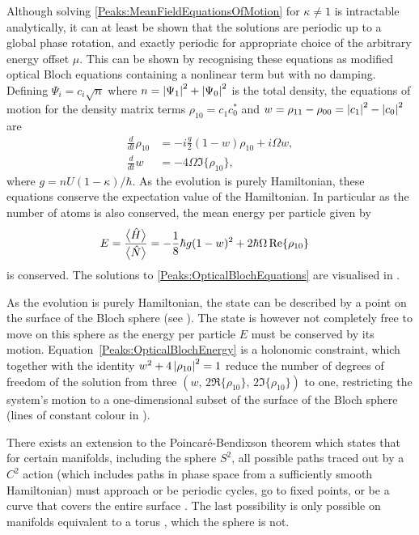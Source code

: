 Although solving \eqref{Peaks:MeanFieldEquationsOfMotion} for $\kappa \neq 1$ is intractable analytically, it can at least be shown that the solutions are periodic up to a global phase rotation, and exactly periodic for appropriate choice of the arbitrary energy offset $\mu$. This can be shown by recognising these equations as modified optical Bloch equations containing a nonlinear term but with no damping. Defining $\Psi_i = c_i\sqrt{n}$ where $n = \left|\Psi_1\right|^2 + \left|\Psi_0\right|^2$ is the total density, the equations of motion for the density matrix terms $\rho_{10} = c_{1}^{}c_{0}^*$ and $w = \rho_{11}-\rho_{00} = \left|c_1\right|^2 - \left|c_0\right|^2$ are
\begin{subequations}
    \label{Peaks:OpticalBlochEquations}
    \begin{align}
        \frac{d}{dt}\rho_{10} &= -i\frac{g}{2} (1-w)\rho_{10} + i \Omega w,\\
        \frac{d }{dt}w &= -4 \Omega \Im\{\rho_{10}\},
    \end{align}
\end{subequations}
where $g = n U (1-\kappa)/\hbar$. As the evolution is purely Hamiltonian, these equations conserve the expectation value of the Hamiltonian. In particular as the number of atoms is also conserved, the mean energy per particle given by
\begin{align}
    E &= \frac{\mean{\hat{H}}}{\mean{\hat{N}}} = -\frac{1}{8}\hbar g(1 - w)^2 + 2 \hbar \Omega \Re\{\rho_{10}\}
    \label{Peaks:OpticalBlochEnergy}
\end{align}
is conserved. The solutions to \eqref{Peaks:OpticalBlochEquations} are visualised in .

As the evolution is purely Hamiltonian, the state can be described by a point on the surface of the Bloch sphere (see ).  The state is however not completely free to move on this sphere as the energy per particle $E$ must be conserved by its motion.  Equation~\eqref{Peaks:OpticalBlochEnergy} is a holonomic constraint, which together with the identity $w^2 + 4 \left|\rho_{10}\right|^2 = 1$ reduce the number of degrees of freedom of the solution from three $(w,\, 2\Re\{\rho_{10}\},\, 2\Im\{\rho_{10}\})$ to one, restricting the system's motion to a one-dimensional subset of the surface of the Bloch sphere (lines of constant colour in ).  

There exists an extension to the Poincaré-Bendixson theorem which states that for certain manifolds, including the sphere $S^2$, all possible paths traced out by a $C^2$ action (which includes paths in phase space from a sufficiently smooth Hamiltonian) must approach or be periodic cycles, go to fixed points, or be a curve that covers the entire surface \citep{Schwartz:1963}.  The last possibility is only possible on manifolds equivalent to a torus \citep{Schwartz:1963}, which the sphere is not.

